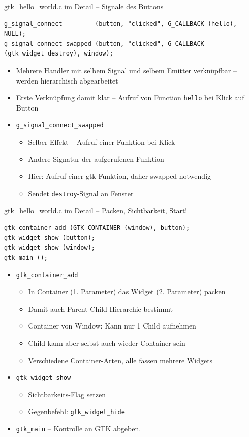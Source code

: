\begin{frame}[fragile]{gtk\_hello\_world.c im Detail -- Signale des Buttons}
%
\begin{verbatim}
g_signal_connect         (button, "clicked", G_CALLBACK (hello), NULL);
g_signal_connect_swapped (button, "clicked", G_CALLBACK (gtk_widget_destroy), window);
\end{verbatim}
%
\begin{itemize}
\item Mehrere Handler mit selbem Signal und selbem Emitter verknüpfbar -- werden hierarchisch abgearbeitet
\item Erste Verknüpfung damit klar -- Aufruf von Function \texttt{hello} bei Klick auf Button
\item \texttt{g\_signal\_connect\_swapped}
	\begin{itemize}
	\item Selber Effekt -- Aufruf einer Funktion bei Klick
	\item Andere Signatur der aufgerufenen Funktion
	\item Hier: Aufruf einer gtk-Funktion, daher swapped notwendig
	\item Sendet \texttt{destroy}-Signal an Fenster
	\end{itemize}
\end{itemize}
%
\end{frame}


\begin{frame}[fragile]{gtk\_hello\_world.c im Detail -- Packen, Sichtbarkeit, Start!}
%
\begin{verbatim}
gtk_container_add (GTK_CONTAINER (window), button);
gtk_widget_show (button);
gtk_widget_show (window);
gtk_main ();
\end{verbatim}
%
\begin{itemize}
\item \texttt{gtk\_container\_add}
	\begin{itemize}
	\item In Container (1. Parameter) das Widget (2. Parameter) packen
	\item Damit auch Parent-Child-Hierarchie bestimmt
	\item Container von Window: Kann nur 1 Child aufnehmen
	\item Child kann aber selbst auch wieder Container sein
	\item Verschiedene Container-Arten, alle fassen mehrere Widgets
	\end{itemize}
\item \texttt{gtk\_widget\_show}
	\begin{itemize}
	\item Sichtbarkeits-Flag setzen
	\item Gegenbefehl: \texttt{gtk\_widget\_hide}
	\end{itemize}
\item \texttt{gtk\_main} -- Kontrolle an GTK abgeben.
\end{itemize}
%
\end{frame}

